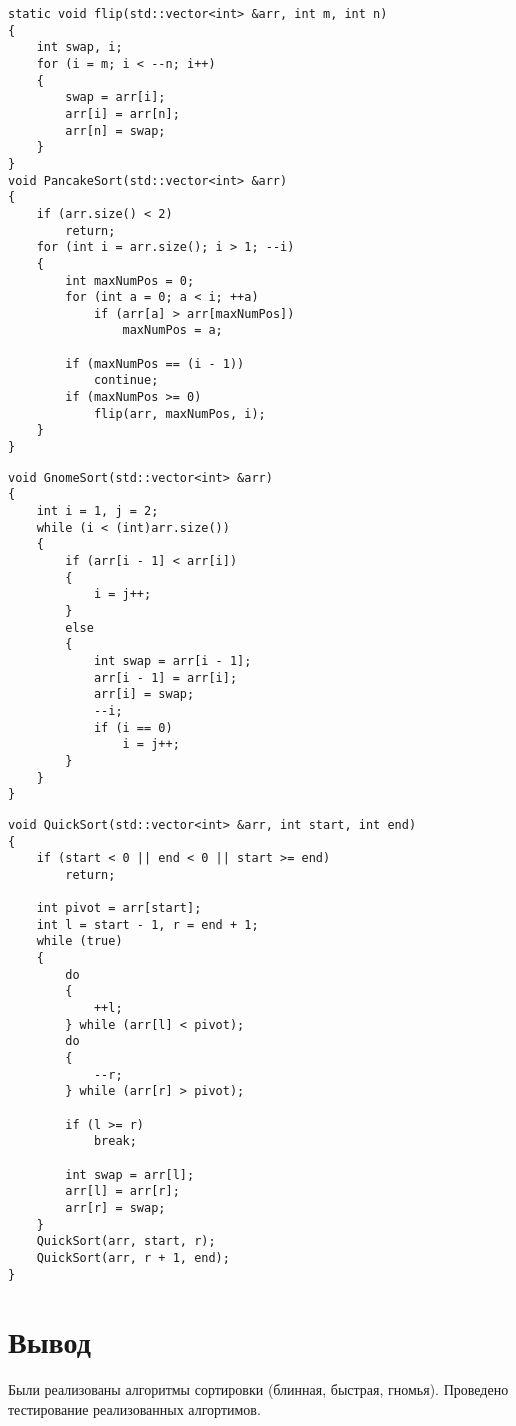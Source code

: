 \begin{lstlisting}[caption={Реализация алгоритма блинной сортировки и вспомогательной функции \texttt{flip}}, label={lst:pancake-sort}]
static void flip(std::vector<int> &arr, int m, int n)
{
    int swap, i;
    for (i = m; i < --n; i++)
    {
        swap = arr[i];
        arr[i] = arr[n];
        arr[n] = swap;
    }
}
void PancakeSort(std::vector<int> &arr)
{
    if (arr.size() < 2)
        return;
    for (int i = arr.size(); i > 1; --i)
    {
        int maxNumPos = 0;
        for (int a = 0; a < i; ++a)
            if (arr[a] > arr[maxNumPos])
                maxNumPos = a;

        if (maxNumPos == (i - 1))
            continue;
        if (maxNumPos >= 0)
            flip(arr, maxNumPos, i);
    }
}
\end{lstlisting}

\clearpage
\begin{lstlisting}[caption={Реализация алгоритма гномьей сортировки}, label={lst:gnome-sort}]
void GnomeSort(std::vector<int> &arr)
{
    int i = 1, j = 2;
    while (i < (int)arr.size())
    {
        if (arr[i - 1] < arr[i])
        {
            i = j++;
        }
        else
        {
            int swap = arr[i - 1];
            arr[i - 1] = arr[i];
            arr[i] = swap;
            --i;
            if (i == 0)
                i = j++;
        }
    }
}
\end{lstlisting}   

\begin{lstlisting}[caption={Реализация алгоритма быстрой сортировки}, label={lst:q-sort}]
void QuickSort(std::vector<int> &arr, int start, int end)
{
    if (start < 0 || end < 0 || start >= end)
        return;

    int pivot = arr[start];
    int l = start - 1, r = end + 1;
    while (true)
    {
        do
        {
            ++l;
        } while (arr[l] < pivot);
        do
        {
            --r;
        } while (arr[r] > pivot);

        if (l >= r)
            break;

        int swap = arr[l];
        arr[l] = arr[r];
        arr[r] = swap;
    }
    QuickSort(arr, start, r);
    QuickSort(arr, r + 1, end);
}
\end{lstlisting}

\section*{Вывод}

Были реализованы алгоритмы сортировки (блинная, быстрая, гномья).
Проведено тестирование реализованных алгортимов.
